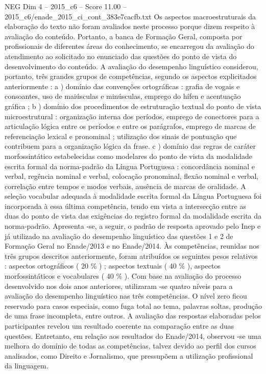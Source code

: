 \begin{textsample}{NEG Dim 4 – 2015\_c6 – Score 11.00 – 2015\_c6/enade\_2015\_ci\_cont\_383e7cacfb.txt}
Os aspectos macroestruturais da elaboração do texto não foram avaliados neste processo porque dizem respeito à avaliação do conteúdo.
Portanto, a banca de Formação Geral, composta por profissionais de diferentes áreas do conhecimento, se encarregou da avaliação do atendimento ao solicitado no enunciado das questões do ponto de vista do desenvolvimento do conteúdo.
A avaliação do desempenho linguístico considerou, portanto, três grandes grupos de competências, segundo os aspectos explicitados anteriormente : a ) domínio das convenções ortográficas : grafia de vogais e consoantes, uso de maiúsculas e minúsculas, emprego do hífen e acentuação gráfica ; b ) domínio dos procedimentos de estruturação textual do ponto de vista microestrutural : organização interna dos períodos, emprego de conectores para a articulação lógica entre os períodos e entre os parágrafos, emprego de marcas de referenciação lexical e pronominal ; utilização dos sinais de pontuação que contribuem para a organização lógica da frase. c ) domínio das regras de caráter morfossintático estabelecidas como modelares do ponto de vista da modalidade escrita formal da norma-padrão da Língua Portuguesa : concordância nominal e verbal, regência nominal e verbal, colocação pronominal, flexão nominal e verbal, correlação entre tempos e modos verbais, ausência de marcas de oralidade.
A seleção vocabular adequada à modalidade escrita formal da Língua Portuguesa foi incorporada à essa última competência, tendo em vista a intersecção entre as duas do ponto de vista das exigências do registro formal da modalidade escrita da norma-padrão.
Apresenta -se, a seguir, o padrão de resposta aprovado pelo Inep e já utilizado na avaliação do desempenho linguístico das questões 1 e 2 de Formação Geral no Enade/2013 e no Enade/2014.
Às competências, reunidas nos três grupos descritos anteriormente, foram atribuídos os seguintes pesos relativos : aspectos ortográficos ( 20 \% ) ; aspectos textuais ( 40 \% ), aspectos morfossintáticos e vocabulares ( 40 \% ).
Com base na avaliação do processo desenvolvido nos dois anos anteriores, utilizaram -se quatro níveis para a avaliação do desempenho linguístico nas três competências.
O nível zero ficou reservado para casos especiais, como fuga total ao tema, palavras soltas, produção de uma frase incompleta, entre outros.
A avaliação das respostas elaboradas pelos participantes revelou um resultado coerente na comparação entre as duas questões.
Entretanto, em relação aos resultados do Enade/2014, observou -se uma melhora do domínio de todas as competências, talvez devido ao perfil dos cursos analisados, como Direito e Jornalismo, que pressupõem a utilização profissional da linguagem.

\end{textsample}
